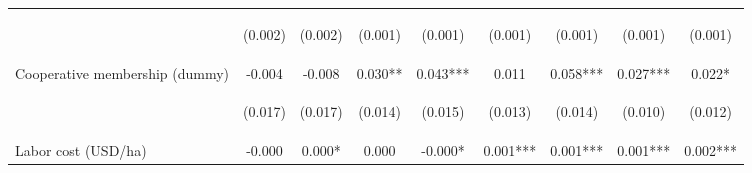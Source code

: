 \begin{center}
\begin{tabular}{lcccccccc}
\vspace{4pt} & \begin{footnotesize}(0.002)\end{footnotesize} & \begin{footnotesize}(0.002)\end{footnotesize} & \begin{footnotesize}(0.001)\end{footnotesize} & \begin{footnotesize}(0.001)\end{footnotesize} & \begin{footnotesize}(0.001)\end{footnotesize} & \begin{footnotesize}(0.001)\end{footnotesize} & \begin{footnotesize}(0.001)\end{footnotesize} & \begin{footnotesize}(0.001)\end{footnotesize} \\
Cooperative membership (dummy) & -0.004 & -0.008 & 0.030** & 0.043*** & 0.011 & 0.058*** & 0.027*** & 0.022* \\
\vspace{4pt} & \begin{footnotesize}(0.017)\end{footnotesize} & \begin{footnotesize}(0.017)\end{footnotesize} & \begin{footnotesize}(0.014)\end{footnotesize} & \begin{footnotesize}(0.015)\end{footnotesize} & \begin{footnotesize}(0.013)\end{footnotesize} & \begin{footnotesize}(0.014)\end{footnotesize} & \begin{footnotesize}(0.010)\end{footnotesize} & \begin{footnotesize}(0.012)\end{footnotesize} \\
Labor cost (USD/ha) & -0.000 & 0.000* & 0.000 & -0.000* & 0.001*** & 0.001*** & 0.001*** & 0.002*** \\

\end{tabular}
\end{center}
